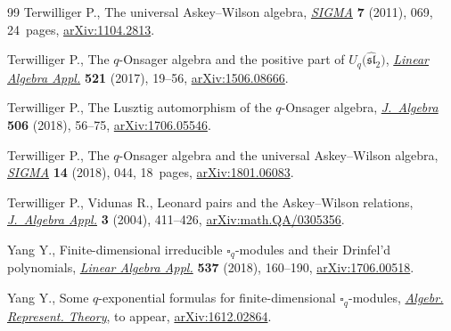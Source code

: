 \documentclass[pdftex]{sigma}
\numberwithin{equation}{section}
\begin{document}
\begin{thebibliography}{99}
Terwilliger P., The universal {A}skey--{W}ilson algebra, \href{https://doi.org/10.3842/SIGMA.2011.069}{\textit{SIGMA}}
 \textbf{7} (2011), 069, 24~pages, \href{https://arxiv.org/abs/1104.2813}{arXiv:1104.2813}.

Terwilliger P., The {$q$}-{O}nsager algebra and the positive part of
 {$U_q\big(\widehat{\mathfrak{sl}}_2\big)$}, \href{https://doi.org/10.1016/j.laa.2017.01.027}{\textit{Linear Algebra Appl.}}
 \textbf{521} (2017), 19--56, \href{https://arxiv.org/abs/1506.08666}{arXiv:1506.08666}.

Terwilliger P., The {L}usztig automorphism of the {$q$}-{O}nsager algebra,
 \href{https://doi.org/10.1016/j.jalgebra.2018.03.026}{\textit{J.~Algebra}} \textbf{506} (2018), 56--75, \href{https://arxiv.org/abs/1706.05546}{arXiv:1706.05546}.

Terwilliger P., The {$q$}-{O}nsager algebra and the universal {A}skey--{W}ilson
 algebra, \href{https://doi.org/10.3842/SIGMA.2018.044}{\textit{SIGMA}} \textbf{14} (2018), 044, 18~pages,
 \href{https://arxiv.org/abs/1801.06083}{arXiv:1801.06083}.

Terwilliger P., Vidunas R., Leonard pairs and the {A}skey--{W}ilson relations,
 \href{https://doi.org/10.1142/S0219498804000940}{\textit{J.~Algebra Appl.}} \textbf{3} (2004), 411--426,
 \href{https://arxiv.org/abs/math.QA/0305356}{arXiv:math.QA/0305356}.

Yang Y., Finite-dimensional irreducible {$\square_q$}-modules and their
 {D}rinfel'd polynomials, \href{https://doi.org/10.1016/j.laa.2017.10.002}{\textit{Linear Algebra Appl.}} \textbf{537} (2018),
 160--190, \href{https://arxiv.org/abs/1706.00518}{arXiv:1706.00518}.

Yang Y., Some $q$-exponential formulas for finite-dimensional
 $\square_q$-modules, \href{https://doi.org/10.1007/s10468-019-09862-y}{\textit{Algebr. Represent. Theory}}, {t}o appear,
 \href{https://arxiv.org/abs/1612.02864}{arXiv:1612.02864}.

\end{thebibliography}\LastPageEnding
\end{document}
